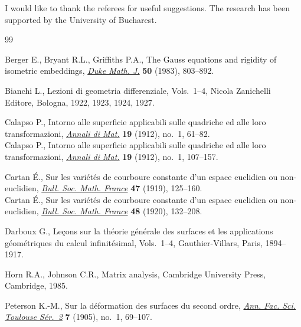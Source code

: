 \documentclass[pdftex]{sigma}
\begin{document}
I would like to thank the referees
for useful suggestions. The research has been supported by the University of Bucharest.


\begin{thebibliography}{99}

\footnotesize\itemsep=0pt

Berger E., Bryant R.L., Grif\/f\/iths P.A.,
The Gauss equations and rigidity of isometric embeddings,
\href{http://dx.doi.org/10.1215/S0012-7094-83-05039-1}{{\it Duke Math. J.}} {\bf 50} (1983), 803--892.

Bianchi  L.,
Lezioni di geometria dif\/ferenziale, Vols.~1--4, Nicola Zanichelli Editore, Bologna, 1922, 1923, 1924, 1927.

Calapso  P.,
Intorno alle superf\/icie applicabili sulle quadriche ed alle loro transformazioni,
\href{http://dx.doi.org/10.1007/BF02419392}{{\it Annali di Mat.}} {\bf 19}  (1912), no.~1, 61--82.\\
Calapso  P.,
Intorno alle superf\/icie applicabili sulle quadriche ed alle loro transformazioni,
\href{http://dx.doi.org/10.1007/BF02419394}{{\it Annali di Mat.}} {\bf 19}  (1912), no.~1, 107--157.

Cartan \'E.,
Sur les vari\'{e}t\'{e}s de courboure constante d'un espace euclidien ou non-euclidien,
\href{http://www.numdam.org/item?id=BSMF_1919__47__125_1}{{\it Bull. Soc. Math. France}} {\bf 47} (1919), 125--160.\\
Cartan \'E.,
Sur les vari\'{e}t\'{e}s de courboure constante d'un espace euclidien ou non-euclidien,
\href{http://www.numdam.org/item?id=BSMF_1920__48__132_1}{{\it Bull. Soc. Math. France}} {\bf 48} (1920), 132--208.

Darboux G.,
Le\c{c}ons sur la th\'{e}orie g\'{e}n\'{e}rale des surfaces et les applications g\'eom\'etriques du calcul inf\/init\'esimal, Vols.~1--4, Gauthier-Villars, Paris, 1894--1917.

Horn  R.A., Johnson C.R.,
Matrix analysis, Cambridge University Press, Cambridge, 1985.

 Peterson  K.-M., Sur la d\'{e}formation des surfaces du second ordre,
\href{http://afst.cedram.org/afst-bin/item?id=AFST_1905_2_7_1_69_0}{{\it Ann. Fac.  Sci. Toulouse S\'{e}r.~2\/}} {\bf 7}  (1905), no.~1, 69--107.

\end{thebibliography}\LastPageEnding
\end{document}
